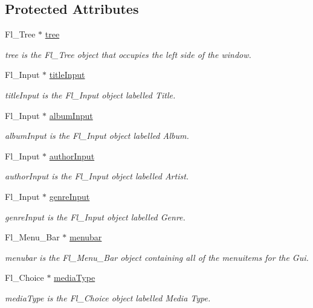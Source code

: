 \subsection*{Protected Attributes}
\begin{DoxyCompactItemize}
\item 
Fl\+\_\+\+Tree $\ast$ \hyperlink{class_media_client_gui_a271cf7771f269da55fbe873f17238ab2}{tree}
\begin{DoxyCompactList}\small\item\em tree is the Fl\+\_\+\+Tree object that occupies the left side of the window. \end{DoxyCompactList}\item 
Fl\+\_\+\+Input $\ast$ \hyperlink{class_media_client_gui_a3e4fe22653dbf41f11c14f5a572e79c8}{title\+Input}
\begin{DoxyCompactList}\small\item\em title\+Input is the Fl\+\_\+\+Input object labelled Title. \end{DoxyCompactList}\item 
Fl\+\_\+\+Input $\ast$ \hyperlink{class_media_client_gui_ad229ede6a3e01efedb9bb640bc04f5fc}{album\+Input}
\begin{DoxyCompactList}\small\item\em album\+Input is the Fl\+\_\+\+Input object labelled Album. \end{DoxyCompactList}\item 
Fl\+\_\+\+Input $\ast$ \hyperlink{class_media_client_gui_adb0217d9d234ca6036f09bb17d89ad1a}{author\+Input}
\begin{DoxyCompactList}\small\item\em author\+Input is the Fl\+\_\+\+Input object labelled Artist. \end{DoxyCompactList}\item 
Fl\+\_\+\+Input $\ast$ \hyperlink{class_media_client_gui_a4724db5935d76a402c21c2bdc376a2f9}{genre\+Input}
\begin{DoxyCompactList}\small\item\em genre\+Input is the Fl\+\_\+\+Input object labelled Genre. \end{DoxyCompactList}\item 
\hypertarget{class_media_client_gui_a10d7b61f4d99022e2be14e5acf37675a}{}Fl\+\_\+\+Menu\+\_\+\+Bar $\ast$ \hyperlink{class_media_client_gui_a10d7b61f4d99022e2be14e5acf37675a}{menubar}\label{class_media_client_gui_a10d7b61f4d99022e2be14e5acf37675a}

\begin{DoxyCompactList}\small\item\em menubar is the Fl\+\_\+\+Menu\+\_\+\+Bar object containing all of the menuitems for the Gui. \end{DoxyCompactList}\item 
Fl\+\_\+\+Choice $\ast$ \hyperlink{class_media_client_gui_a8352bda5833f6e4ce4bcb760cae27ebe}{media\+Type}
\begin{DoxyCompactList}\small\item\em media\+Type is the Fl\+\_\+\+Choice object labelled Media Type. \end{DoxyCompactList}\end{DoxyCompactItemize}


